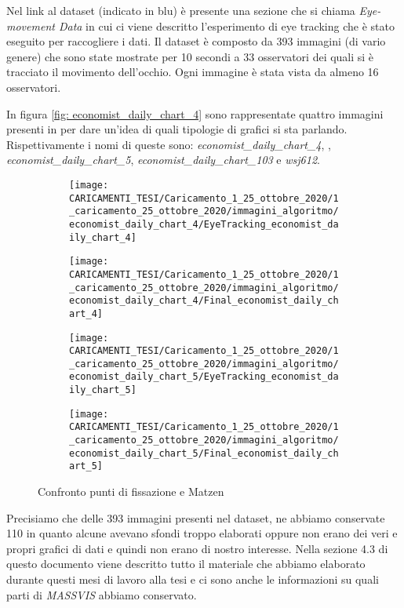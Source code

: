 \documentclass[%
	corpo=12pt,
    twoside,
    stile=classica,
    oldstyle,
    tipotesi=custom,
    greek,
    evenboxes,
]{toptesi}
\begin{document}
{Nel link al dataset (indicato in blu) è presente una sezione che si chiama \textit{Eye-movement Data} in cui ci viene descritto l'esperimento di eye tracking che è stato eseguito per raccogliere i dati. Il dataset è composto da 393 immagini (di vario genere) che sono state mostrate per 10 secondi a 33 osservatori dei quali si è tracciato il movimento dell'occhio. Ogni immagine è stata vista da almeno 16 osservatori. 

In figura \ref{fig: economist_daily_chart_4} sono rappresentate quattro immagini presenti in  per dare un'idea di quali tipologie di grafici si sta parlando. Rispettivamente i nomi di queste sono: \textit{economist\_daily\_chart\_4}, , \textit{economist\_daily\_chart\_5}, \textit{economist\_daily\_chart\_103} e \textit{wsj612}. 
\begin{figure}[!htb]\centering
\begin{subfigure}
\centering
\texttt{[image: CARICAMENTI\_TESI/Caricamento\_1\_25\_ottobre\_2020/1\_caricamento\_25\_ottobre\_2020/immagini\_algoritmo/economist\_daily\_chart\_4/EyeTracking\_economist\_daily\_chart\_4]}
\end{subfigure}
\begin{subfigure}
\centering
\texttt{[image: CARICAMENTI\_TESI/Caricamento\_1\_25\_ottobre\_2020/1\_caricamento\_25\_ottobre\_2020/immagini\_algoritmo/economist\_daily\_chart\_4/Final\_economist\_daily\_chart\_4]}
\end{subfigure}
\begin{subfigure}
\centering
\texttt{[image: CARICAMENTI\_TESI/Caricamento\_1\_25\_ottobre\_2020/1\_caricamento\_25\_ottobre\_2020/immagini\_algoritmo/economist\_daily\_chart\_5/EyeTracking\_economist\_daily\_chart\_5]}
\end{subfigure}
\begin{subfigure}
\centering
\texttt{[image: CARICAMENTI\_TESI/Caricamento\_1\_25\_ottobre\_2020/1\_caricamento\_25\_ottobre\_2020/immagini\_algoritmo/economist\_daily\_chart\_5/Final\_economist\_daily\_chart\_5]}
\end{subfigure}
\caption{Confronto punti di fissazione e Matzen}\label{fig: EyeTracking_economist_daily_chart_4}
\end{figure}
Precisiamo che delle 393 immagini presenti nel dataset, ne abbiamo conservate 110 in quanto alcune avevano sfondi troppo elaborati oppure non erano dei veri e propri grafici di dati e quindi non erano di nostro interesse. Nella sezione 4.3 di questo documento viene descritto tutto il materiale che abbiamo elaborato durante questi mesi di lavoro alla tesi e ci sono anche le informazioni su quali parti di \textit{MASSVIS} abbiamo conservato.

}
\end{document}
